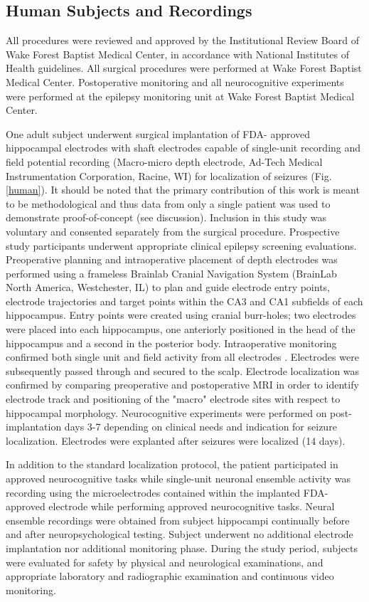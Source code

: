 \documentclass[11pt,a4paper,final]{article}
\begin{document}
\subsection{Human Subjects and Recordings}
All procedures were reviewed and approved by the Institutional Review Board of Wake Forest Baptist Medical Center, in accordance with National Institutes of Health guidelines.
All surgical procedures were performed at Wake Forest Baptist Medical Center.
Postoperative monitoring and all neurocognitive experiments were performed at the epilepsy monitoring unit at Wake Forest Baptist Medical Center.

One adult subject underwent surgical implantation of FDA- approved hippocampal electrodes with shaft electrodes capable of single-unit recording and field potential recording (Macro-micro depth electrode, Ad-Tech Medical Instrumentation Corporation, Racine, WI) for localization of seizures (Fig. \ref{human}).
It should be noted that the primary contribution of this work is meant to be methodological and thus data from only a single patient was used to demonstrate proof-of-concept (see discussion). 
Inclusion in this study was voluntary and consented separately from the surgical procedure. Prospective study participants underwent appropriate clinical epilepsy screening evaluations.
Preoperative planning and intraoperative placement of depth electrodes was performed using a frameless Brainlab Cranial Navigation System (BrainLab North America, Westchester, IL) to plan and guide electrode entry points, electrode trajectories and target points within the CA3 and CA1 subfields of each hippocampus.
Entry points were created using cranial burr-holes; two electrodes were placed into each hippocampus, one anteriorly positioned in the head of the hippocampus and a second in the  posterior body.
Intraoperative monitoring confirmed both single unit and field activity from all electrodes \citep{viskontas07}.
Electrodes were subsequently passed through and secured to the scalp.
Electrode localization was confirmed by comparing preoperative and postoperative MRI in order to identify electrode track and positioning of the "macro" electrode sites with respect to hippocampal morphology.
Neurocognitive experiments were performed on post-implantation days 3-7 depending on clinical needs and indication for seizure localization.
Electrodes were explanted after seizures were localized (14 days).

In addition to the standard localization protocol, the patient participated in approved neurocognitive tasks while single-unit neuronal ensemble activity was recording using the microelectrodes contained within the implanted FDA-approved electrode while performing approved neurocognitive tasks.
Neural ensemble recordings were obtained from subject hippocampi continually before and after neuropsychological testing.
Subject underwent no additional electrode implantation nor additional monitoring phase.
During the study period, subjects were evaluated for safety by physical and neurological examinations, and appropriate laboratory and radiographic examination and continuous video monitoring.
\end{document}
